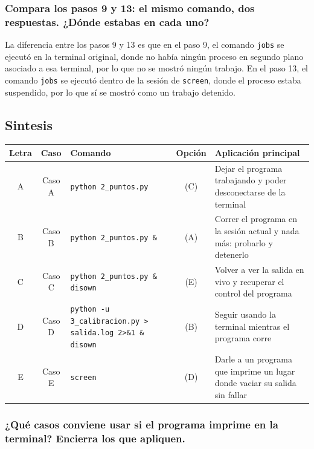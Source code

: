 \documentclass[12pt, letterpaper]{article}
\begin{document}
\subsubsection*{Compara los pasos 9 y 13: el mismo comando, dos respuestas. ¿Dónde estabas en cada uno?}

La diferencia entre los pasos 9 y 13 es que en el paso 9, el comando \texttt{jobs} se ejecutó en la terminal original, donde no había ningún proceso en segundo plano asociado a esa terminal, por lo que no se mostró ningún trabajo. En el paso 13, el comando \texttt{jobs} se ejecutó dentro de la sesión de \texttt{screen}, donde el proceso estaba suspendido, por lo que sí se mostró como un trabajo detenido.

\subsection*{\fontsize{12}{17}\selectfont Sintesis}

\renewcommand{\arraystretch}{1.35}
\begin{table}[H]
	\centering
	\begin{tabularx}{\textwidth}{|c|c|X|c|X|}
		\hline
		\rowcolor{gray!25}
		\textbf{Letra} & \textbf{Caso} & \textbf{Comando} & \textbf{Opción} & \textbf{Aplicación principal} \\ \hline
		A & Caso A & \texttt{python 2\_puntos.py} & (C) & Dejar el programa trabajando y poder desconectarse de la terminal \\ \hline
		B & Caso B & \texttt{python 2\_puntos.py \&} & (A) & Correr el programa en la sesión actual y nada más: probarlo y detenerlo \\ \hline
		C & Caso C & \texttt{python 2\_puntos.py \& disown} & (E) & Volver a ver la salida en vivo y recuperar el control del programa \\ \hline
		D & Caso D & \texttt{python -u 3\_calibracion.py > salida.log 2>\&1 \& disown} & (B) & Seguir usando la terminal mientras el programa corre \\ \hline
		E & Caso E & \texttt{screen} & (D) & Darle a un programa que imprime un lugar donde vaciar su salida sin fallar \\ \hline
	\end{tabularx}
\end{table}

\vspace{0.5cm}
\subsubsection*{¿Qué casos conviene usar si el programa imprime en la terminal? Encierra los que apliquen.}
\end{document}
